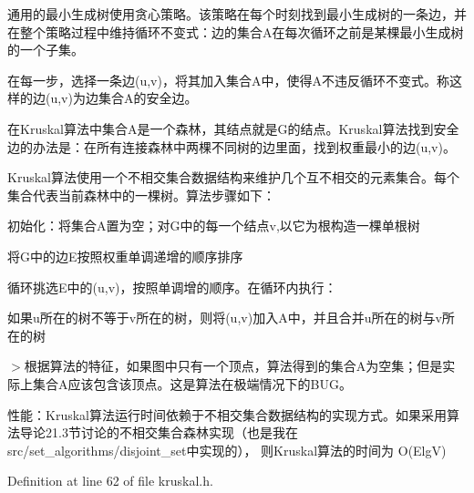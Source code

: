 通用的最小生成树使用贪心策略。该策略在每个时刻找到最小生成树的一条边，并在整个策略过程中维持循环不变式：边的集合\+A在每次循环之前是某棵最小生成树的一个子集。

在每一步，选择一条边(u,v)，将其加入集合\+A中，使得\+A不违反循环不变式。称这样的边(u,v)为边集合\+A的安全边。

在\+Kruskal算法中集合\+A是一个森林，其结点就是\+G的结点。\+Kruskal算法找到安全边的办法是：在所有连接森林中两棵不同树的边里面，找到权重最小的边(u,v)。

Kruskal算法使用一个不相交集合数据结构来维护几个互不相交的元素集合。每个集合代表当前森林中的一棵树。算法步骤如下：


\begin{DoxyItemize}
\item 初始化：将集合\+A置为空；对\+G中的每一个结点v,以它为根构造一棵单根树
\item 将\+G中的边\+E按照权重单调递增的顺序排序
\item 循环挑选\+E中的(u,v)，按照单调增的顺序。在循环内执行：
\begin{DoxyItemize}
\item 如果u所在的树不等于v所在的树，则将(u,v)加入\+A中，并且合并u所在的树与v所在的树
\end{DoxyItemize}
\end{DoxyItemize}

$>$根据算法的特征，如果图中只有一个顶点，算法得到的集合\+A为空集；但是实际上集合\+A应该包含该顶点。这是算法在极端情况下的\+B\+U\+G。

性能：\+Kruskal算法运行时间依赖于不相交集合数据结构的实现方式。如果采用算法导论21.3节讨论的不相交集合森林实现（也是我在src/set\+\_\+algorithms/disjoint\+\_\+set中实现的）， 则\+Kruskal算法的时间为 O(\+Elg\+V) 

Definition at line 62 of file kruskal.\+h.

\hypertarget{namespace_introduction_to_algorithm_1_1_graph_algorithm_aba1581358d79ba82dc4fd0c15bc987e6}{}
